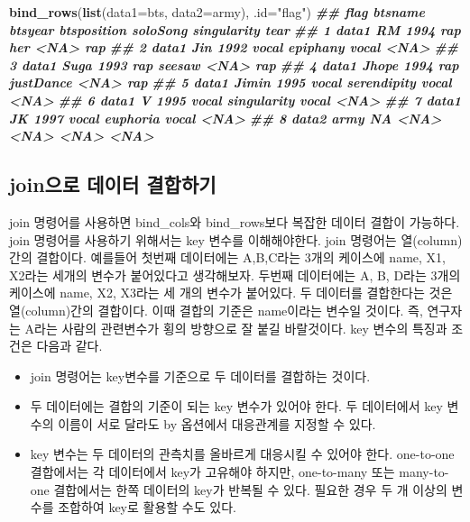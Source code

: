 \documentclass[
]{book}
\newenvironment{Shaded}{\begin{snugshade}}{\end{snugshade}}
\newcommand{\AttributeTok}[1]{\textcolor[rgb]{0.13,0.29,0.53}{#1}}
\newcommand{\DocumentationTok}[1]{\textcolor[rgb]{0.56,0.35,0.01}{\textbf{\textit{#1}}}}
\newcommand{\FunctionTok}[1]{\textcolor[rgb]{0.13,0.29,0.53}{\textbf{#1}}}
\newcommand{\NormalTok}[1]{#1}
\newcommand{\StringTok}[1]{\textcolor[rgb]{0.31,0.60,0.02}{#1}}
\providecommand{\tightlist}{%
  \setlength{\itemsep}{0pt}\setlength{\parskip}{0pt}}
\begin{document}
\begin{Shaded}
\begin{Highlighting}[]
\FunctionTok{bind\_rows}\NormalTok{(}\FunctionTok{list}\NormalTok{(}\AttributeTok{data1=}\NormalTok{bts, }\AttributeTok{data2=}\NormalTok{army), }\AttributeTok{.id=}\StringTok{"flag"}\NormalTok{)}
\DocumentationTok{\#\#    flag btsname btsyear btsposition    soloSong singularity tear}
\DocumentationTok{\#\# 1 data1      RM    1994         rap         her        \textless{}NA\textgreater{}  rap}
\DocumentationTok{\#\# 2 data1     Jin    1992       vocal    epiphany       vocal \textless{}NA\textgreater{}}
\DocumentationTok{\#\# 3 data1    Suga    1993         rap      seesaw        \textless{}NA\textgreater{}  rap}
\DocumentationTok{\#\# 4 data1   Jhope    1994         rap   justDance        \textless{}NA\textgreater{}  rap}
\DocumentationTok{\#\# 5 data1   Jimin    1995       vocal serendipity       vocal \textless{}NA\textgreater{}}
\DocumentationTok{\#\# 6 data1       V    1995       vocal singularity       vocal \textless{}NA\textgreater{}}
\DocumentationTok{\#\# 7 data1      JK    1997       vocal    euphoria       vocal \textless{}NA\textgreater{}}
\DocumentationTok{\#\# 8 data2    army      NA        \textless{}NA\textgreater{}        \textless{}NA\textgreater{}        \textless{}NA\textgreater{} \textless{}NA\textgreater{}}
\end{Highlighting}
\end{Shaded}

\subsection{join으로 데이터 결합하기}\label{joinuxc73cuxb85c-uxb370uxc774uxd130-uxacb0uxd569uxd558uxae30}

join 명령어를 사용하면 bind\_cols와 bind\_rows보다 복잡한 데이터 결합이 가능하다. join 명령어를 사용하기 위해서는 key 변수를 이해해야한다. join 명령어는 열(column)간의 결합이다. 예를들어 첫번째 데이터에는 A,B,C라는 3개의 케이스에 name, X1, X2라는 세개의 변수가 붙어있다고 생각해보자. 두번째 데이터에는 A, B, D라는 3개의 케이스에 name, X2, X3라는 세 개의 변수가 붙어있다. 두 데이터를 결합한다는 것은 열(column)간의 결합이다. 이때 결합의 기준은 name이라는 변수일 것이다. 즉, 연구자는 A라는 사람의 관련변수가 횡의 방향으로 잘 붙길 바랄것이다. key 변수의 특징과 조건은 다음과 같다.

\begin{itemize}
\tightlist
\item
  join 명령어는 key변수를 기준으로 두 데이터를 결합하는 것이다.
\item
  두 데이터에는 결합의 기준이 되는 key 변수가 있어야 한다. 두 데이터에서 key 변수의 이름이 서로 달라도 by 옵션에서 대응관계를 지정할 수 있다.
\item
  key 변수는 두 데이터의 관측치를 올바르게 대응시킬 수 있어야 한다. one-to-one 결합에서는 각 데이터에서 key가 고유해야 하지만, one-to-many 또는 many-to-one 결합에서는 한쪽 데이터의 key가 반복될 수 있다. 필요한 경우 두 개 이상의 변수를 조합하여 key로 활용할 수도 있다.
\end{itemize}
\end{document}
